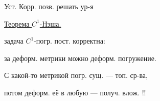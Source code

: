 \begin{flushright}\end{flushright}







Уст. Корр. позв. решать ур-я





\underline{Теорема $C^1$-Нэша.}





задача $C^1$-погр. пост. корректна:

за деформ. метрики можно деформ. погружение.





С какой-то метрикой погр. сущ. --- топ. ср-ва,

потом деформ. её в любую --- получ. влож. !!





